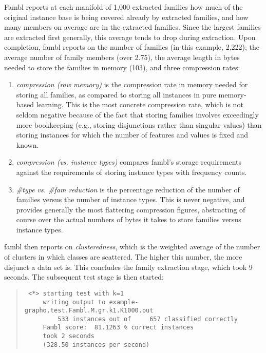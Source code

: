 \documentclass[11pt]{article}
\begin{document}
{\sc Fambl} reports at each manifold of 1,000 extracted families
how much of the original instance base is being covered already by
extracted families, and how many members on average are in the
extracted families. Since the largest families are extracted first
generally, this average tends to drop during extraction. Upon
completion, {\sc fambl} reports on the number of families (in this
example, 2,222); the average number of family members (over 2.75),
the average length in bytes needed to store the families in memory
(103), and three compression rates:

\begin{enumerate}

\item
{\em compression (raw memory)} is the compression rate in memory
needed for storing all families, as compared to storing all instances
in pure memory-based learning. This is the most concrete compression
rate, which is not seldom negative because of the fact that storing
families involves exceedingly more bookkeeping (e.g., storing
disjunctions rather than singular values) than storing instances for
which the number of features and values is fixed and known.

\item
{\em compression (vs. instance types)} compares {\sc fambl}'s storage
requirements against the requirements of storing instance types with
frequency counts.

\item
{\em \#type vs. \#fam reduction} is the percentage reduction of the
number of families versus the number of instance types. This is never
negative, and provides generally the most flattering compression
figures, abstracting of course over the actual numbers of bytes it
takes to store families versus instance types.
\end{enumerate}

{\sc fambl} then reports on {\em clusteredness}, which is the weighted
average of the number of clusters in which classes are scattered. The
higher this number, the more disjunct a data set is. This concludes
the family extraction stage, which took 9 seconds. The subsequent test
stage is then started:

\begin{quote}
{\tiny
\begin{verbatim}
 <*> starting test with k=1
     writing output to example-grapho.test.Fambl.M.gr.k1.K1000.out
         533 instances out of     657 classified correctly
     Fambl score:  81.1263 % correct instances
     took 2 seconds
     (328.50 instances per second)
\end{verbatim}
}
\end{quote}
\end{document}
